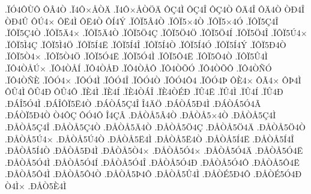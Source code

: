 {.^^cf^^d34^^d4^^d9^^d4
^^d4^^c24^^d2
.^^cf4^^d4^^d7^^c5^^d2^^c4
.^^cf4^^d4^^d7^^c5^^d2^^d6^^c4
^^d4^^c74^^cc
^^d4^^c74^^ce
^^d4^^c74^^d2
^^d4^^c44^^ce
^^d4^^c44^^d2
^^d2^^d04^^ce
^^d2^^d04^^db
^^d4^^da4^^d7
^^d4^^cb4^^cc
^^d4^^cb4^^d2
^^d4^^cd4^^dd
.^^cf^^d4^^cf5^^c24^^d2
.^^cf^^d4^^cf5^^d74^^d2
.^^cf^^d4^^cf5^^d74^^d3
.^^cf^^d4^^cf5^^c74^^ce
.^^cf^^d4^^cf5^^c74^^d2
.^^cf^^d4^^cf5^^c44^^d7
.^^cf^^d4^^cf5^^c44^^d2
.^^cf^^d4^^cf5^^d64^^c7
.^^cf^^d4^^cf5^^d64^^d6
.^^cf^^d4^^cf5^^d64^^cd
.^^cf^^d4^^cf5^^d64^^ce
.^^cf^^d4^^cf5^^da4^^d7
.^^cf^^d4^^cf5^^cc4^^c7
.^^cf^^d4^^cf5^^cc4^^d6
.^^cf^^d4^^cf5^^cd4^^cb
.^^cf^^d4^^cf5^^cd4^^ce
.^^cf^^d4^^cf5^^cd4^^d2
.^^cf^^d4^^cf5^^cd4^^d3
.^^cf^^d4^^cf5^^cd4^^dd
.^^cf^^d4^^cf5^^d04^^d2
.^^cf^^d4^^cf5^^d24^^d7
.^^cf^^d4^^cf5^^d24^^d6
.^^cf^^d4^^cf5^^d34^^cb
.^^cf^^d4^^cf5^^d34^^cc
.^^cf^^d4^^cf5^^d44^^cb
.^^cf^^d4^^cf5^^d44^^d2
.^^cf^^d4^^cf5^^db4^^cc
.^^cf^^d44^^d2^^c5^^da^^d7
.^^cf^^d44^^d2^^c5^^cd
.^^cf^^d44^^d2^^c5^^d0
.^^cf^^d44^^d2^^c5^^d4
.^^cf^^d44^^d2^^d5^^d3
.^^cf^^d44^^d2^^d5^^d4
.^^cf^^d44^^d2^^d1^^d3
.^^cf^^d44^^d2^^d1^^c8
.^^cf^^d4^^d34^^d7
.^^cf^^d4^^d34^^cc
.^^cf^^d4^^d34^^ce
.^^cf^^d4^^d34^^d2
.^^cf^^d4^^d34^^d44
.^^cf^^d4^^d34^^de
^^d4^^c84^^d7
^^d4^^c34^^d7
^^d4^^de4^^cc
^^d4^^db4^^cc
^^d4^^db4^^d0
^^d4^^db4^^d4
.^^cf^^c84^^cc
.^^cf^^c84^^cd
.^^cf^^c84^^d2^^c1^^ce
.^^cf^^c84^^d2^^c9^^d0
.^^cf^^db4^^cb
.^^cf^^db4^^cc
.^^cf^^db4^^cd
.^^cf^^db4^^d0
.^^d0^^c1^^ce5^^d34^^cc
.^^d0^^c1^^ce^^d4^^cf5^^cb4^^d2
.^^d0^^c1^^d2^^c15^^c74^^ce
^^ce4^^c4^^d6
.^^d0^^c1^^d2^^c15^^d04^^cc
.^^d0^^c1^^d2^^c15^^d34^^c3
.^^d0^^c1^^d2^^cf5^^d04^^d2
^^d24^^d4^^c7
^^d4^^d34^^d4
^^ce4^^c7^^c2
.^^d0^^c5^^d2^^c55^^c24^^d2
.^^d0^^c5^^d2^^c55^^d74^^d2
.^^d0^^c5^^d2^^c55^^c74^^cc
.^^d0^^c5^^d2^^c55^^c74^^ce
.^^d0^^c5^^d2^^c55^^c74^^d2
.^^d0^^c5^^d2^^c55^^c44^^d2
.^^d0^^c5^^d2^^c55^^d64^^c7
.^^d0^^c5^^d2^^c55^^d64^^c4
.^^d0^^c5^^d2^^c55^^d64^^d2
.^^d0^^c5^^d2^^c55^^da4^^d7
.^^d0^^c5^^d2^^c55^^da4^^d2
.^^d0^^c5^^d2^^c55^^cb4^^cc
.^^d0^^c5^^d2^^c55^^cb4^^d2
.^^d0^^c5^^d2^^c55^^cd4^^cb
.^^d0^^c5^^d2^^c55^^cd4^^ce
.^^d0^^c5^^d2^^c55^^cd4^^d2
.^^d0^^c5^^d2^^c55^^d04^^cc
.^^d0^^c5^^d2^^c55^^d24^^d7
.^^d0^^c5^^d2^^c55^^d34^^d7
.^^d0^^c5^^d2^^c55^^d34^^c4
.^^d0^^c5^^d2^^c55^^d34^^cb
.^^d0^^c5^^d2^^c55^^d34^^cc
.^^d0^^c5^^d2^^c55^^d34^^cd
.^^d0^^c5^^d2^^c55^^d34^^ce
.^^d0^^c5^^d2^^c55^^d34^^d0
.^^d0^^c5^^d2^^c55^^d34^^d4
.^^d0^^c5^^d2^^c55^^d44^^cb
.^^d0^^c5^^d2^^c55^^d44^^cc
.^^d0^^c5^^d2^^c55^^d44^^d2
.^^d0^^c5^^d2^^c55^^de4^^d4
.^^d0^^c5^^d2^^c55^^db4^^cc
.^^d0^^c5^^d2^^c95^^d04^^d4
.^^d0^^c5^^d2^^c95^^d34^^d0
^^d24^^cc^^d7
.^^d0^^c5^^d25^^c84^^cc
}
